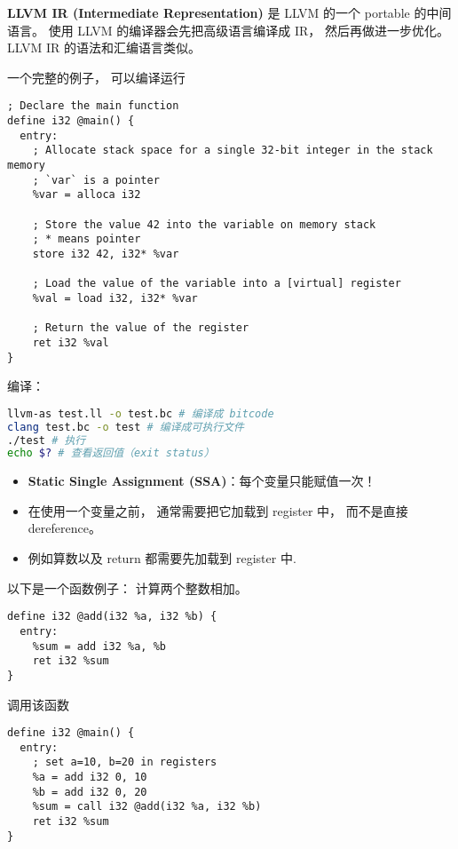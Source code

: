 

\textbf{LLVM IR (Intermediate Representation)} 是 LLVM 的一个 portable 的中间语言。 使用 LLVM 的编译器会先把高级语言编译成 IR， 然后再做进一步优化。 LLVM IR 的语法和汇编语言类似。

一个完整的例子， 可以编译运行
\begin{lstlisting}[language=none,caption=test.ll]
; Declare the main function
define i32 @main() {
  entry:
    ; Allocate stack space for a single 32-bit integer in the stack memory
    ; `var` is a pointer
    %var = alloca i32

    ; Store the value 42 into the variable on memory stack
    ; * means pointer
    store i32 42, i32* %var

    ; Load the value of the variable into a [virtual] register
    %val = load i32, i32* %var

    ; Return the value of the register
    ret i32 %val
}
\end{lstlisting}

编译：
\begin{lstlisting}[language=bash]
llvm-as test.ll -o test.bc # 编译成 bitcode
clang test.bc -o test # 编译成可执行文件
./test # 执行
echo $? # 查看返回值（exit status）
\end{lstlisting}

\begin{itemize}
\item \textbf{Static Single Assignment (SSA)}：每个变量只能赋值一次！
\item  在使用一个变量之前， 通常需要把它加载到 register 中， 而不是直接 dereference。
\item 例如算数以及 return 都需要先加载到 register 中.
\end{itemize}

以下是一个函数例子： 计算两个整数相加。
\begin{lstlisting}[language=none]
define i32 @add(i32 %a, i32 %b) {
  entry:
    %sum = add i32 %a, %b
    ret i32 %sum
}
\end{lstlisting}

调用该函数
\begin{lstlisting}[language=none]
define i32 @main() {
  entry:
    ; set a=10, b=20 in registers
    %a = add i32 0, 10
    %b = add i32 0, 20
    %sum = call i32 @add(i32 %a, i32 %b)
    ret i32 %sum
}
\end{lstlisting}

